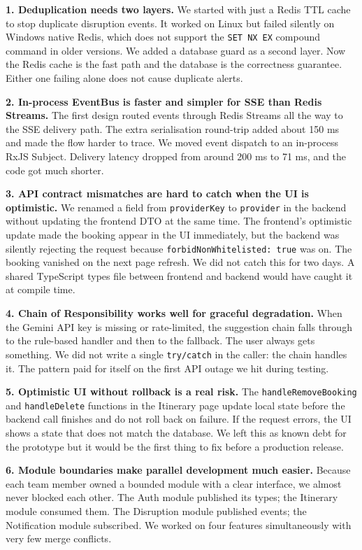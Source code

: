 \documentclass[12pt,a4paper]{article}
\begin{document}
\textbf{1. Deduplication needs two layers.}
We started with just a Redis TTL cache to stop duplicate disruption events. It worked on Linux
but failed silently on Windows native Redis, which does not support the \texttt{SET NX EX}
compound command in older versions. We added a database guard as a second layer. Now the Redis
cache is the fast path and the database is the correctness guarantee. Either one failing alone
does not cause duplicate alerts.

\vspace{0.5em}
\textbf{2. In-process EventBus is faster and simpler for SSE than Redis Streams.}
The first design routed events through Redis Streams all the way to the SSE delivery path. The
extra serialisation round-trip added about 150 ms and made the flow harder to trace. We moved
event dispatch to an in-process RxJS Subject. Delivery latency dropped from around 200 ms to
71 ms, and the code got much shorter.

\vspace{0.5em}
\textbf{3. API contract mismatches are hard to catch when the UI is optimistic.}
We renamed a field from \texttt{providerKey} to \texttt{provider} in the backend without
updating the frontend DTO at the same time. The frontend's optimistic update made the booking
appear in the UI immediately, but the backend was silently rejecting the request because
\texttt{forbidNonWhitelisted: true} was on. The booking vanished on the next page refresh. We
did not catch this for two days. A shared TypeScript types file between frontend and backend
would have caught it at compile time.

\vspace{0.5em}
\textbf{4. Chain of Responsibility works well for graceful degradation.}
When the Gemini API key is missing or rate-limited, the suggestion chain falls through to the
rule-based handler and then to the fallback. The user always gets something. We did not write a
single \texttt{try/catch} in the caller: the chain handles it. The pattern paid for itself on
the first API outage we hit during testing.

\vspace{0.5em}
\textbf{5. Optimistic UI without rollback is a real risk.}
The \texttt{handleRemoveBooking} and \texttt{handleDelete} functions in the Itinerary page
update local state before the backend call finishes and do not roll back on failure. If the
request errors, the UI shows a state that does not match the database. We left this as known
debt for the prototype but it would be the first thing to fix before a production release.

\vspace{0.5em}
\textbf{6. Module boundaries make parallel development much easier.}
Because each team member owned a bounded module with a clear interface, we almost never blocked
each other. The Auth module published its types; the Itinerary module consumed them. The
Disruption module published events; the Notification module subscribed. We worked on four
features simultaneously with very few merge conflicts.
\end{document}
